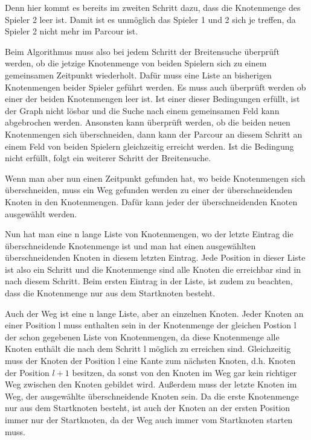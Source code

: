 \documentclass[a4paper,10pt,ngerman]{scrartcl}
\begin{document}
    Denn hier kommt es bereits im zweiten Schritt dazu, dass die Knotenmenge des Spieler 2 leer ist.
    Damit ist es unmöglich das Spieler 1 und 2 sich je treffen, da Spieler 2 nicht mehr im Parcour ist.
    
    Beim Algorithmus muss also bei jedem Schritt der Breitensuche überprüft werden,
    ob die jetzige Knotenmenge von beiden Spielern sich
    zu einem gemeinsamen Zeitpunkt wiederholt.
    Dafür muss eine Liste an bisherigen Knotenmengen beider Spieler geführt werden.
    Es muss auch überprüft werden ob einer der beiden Knotenmengen leer ist.
    Ist einer dieser Bedingungen erfüllt, ist der Graph nicht lösbar
    und die Suche nach einem gemeinsamen Feld kann abgebrochen werden.
    Ansonsten kann überprüft werden,
    ob die beiden neuen Knotenmengen sich überschneiden,
    dann kann der Parcour an diesem Schritt an einem Feld
    von beiden Spielern gleichzeitig erreicht werden.
    Ist die Bedingung nicht erfüllt,
    folgt ein weiterer Schritt der Breitensuche.
    
    Wenn man aber nun einen Zeitpunkt gefunden hat,
    wo beide Knotenmengen sich überschneiden,
    muss ein Weg gefunden werden zu
    einer der überschneidenden Knoten in den Knotenmengen.
    Dafür kann jeder der überschneidenden Knoten ausgewählt werden.
    
    Nun hat man eine n lange Liste von Knotenmengen,
    wo der letzte Eintrag die überschneidende Knotenmenge ist
    und man hat einen ausgewählten überschneidenden Knoten in diesem letzten Eintrag.
    Jede Position in dieser Liste ist also ein Schritt
    und die Knotenmenge sind alle Knoten die erreichbar sind in nach diesem Schritt.
    Beim ersten Eintrag in der Liste,
    ist zudem zu beachten,
    dass die Knotenmenge nur aus dem Startknoten besteht.

	Auch der Weg ist eine n lange Liste,
	aber an einzelnen Knoten.
	Jeder Knoten an einer Position l muss enthalten sein
	in der Knotenmenge der gleichen Postion l der schon gegebenen Liste von Knotenmengen,
	da diese Knotenmenge alle Knoten enthält die nach dem Schritt l möglich zu erreichen sind.
	Gleichzeitig muss der Knoten der Position l eine Kante zum nächsten Knoten,
	d.h. Knoten der Position $l + 1$ besitzen,
	da sonst von den Knoten im Weg
	gar kein richtiger Weg zwischen den Knoten gebildet wird.
	Außerdem muss der letzte Knoten im Weg,
	der ausgewählte überschneidende Knoten sein.
	Da die erste Knotenmenge nur aus dem Startknoten besteht,
	ist auch der Knoten an der ersten Position immer nur der Startknoten,
	da der Weg auch immer vom Startknoten starten muss.
    
\end{document}

